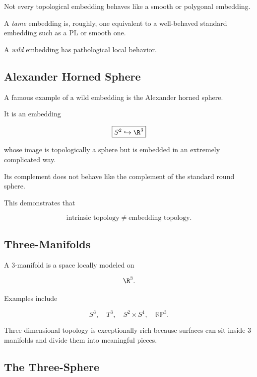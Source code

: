 Not every topological embedding behaves like a smooth or polygonal
embedding.

A \emph{tame} embedding is, roughly, one equivalent to a well-behaved
standard embedding such as a PL or smooth one.

A \emph{wild} embedding has pathological local behavior.

\subsection{Alexander Horned Sphere}
\label{subsec:alexander-horned-sphere}

A famous example of a wild embedding is the Alexander horned sphere.

It is an embedding

\[
\boxed{
S^2\hookrightarrow\R^3
}
\]

whose image is topologically a sphere but is embedded in an extremely
complicated way.

Its complement does not behave like the complement of the standard round
sphere.

This demonstrates that

\[
\boxed{
\text{intrinsic topology}
\neq
\text{embedding topology}.
}
\]

\subsection{Three-Manifolds}
\label{subsec:three-manifolds-geometric}

A \(3\)-manifold is a space locally modeled on

\[
\R^3.
\]

Examples include

\[
\boxed{
S^3,
\quad
T^3,
\quad
S^2\times S^1,
\quad
\mathbb{RP}^3.
}
\]

Three-dimensional topology is exceptionally rich because surfaces can sit
inside \(3\)-manifolds and divide them into meaningful pieces.

\subsection{The Three-Sphere}
\label{subsec:three-sphere-geometric}


